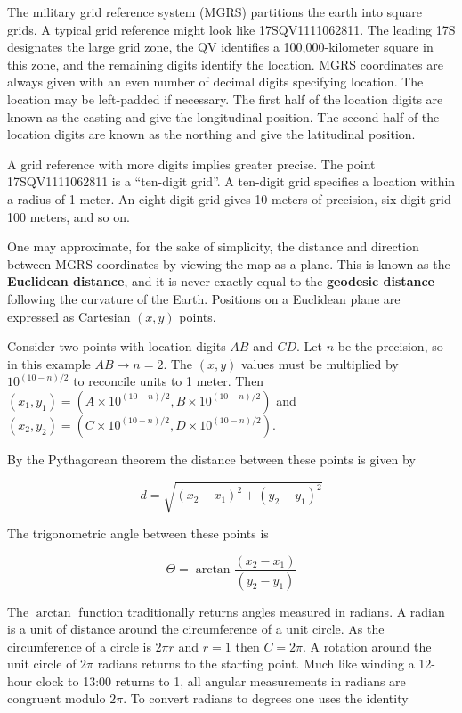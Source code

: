 \documentclass{book}
\begin{document}
The military grid reference system (MGRS) partitions the earth into square grids. A typical grid reference might look like 17SQV1111062811. The leading 17S designates the large grid zone, the QV identifies a 100,000-kilometer square in this zone, and the remaining digits identify the location. MGRS coordinates are always given with an even number of decimal digits specifying location. The location may be left-padded if necessary. The first half of the location digits are known as the easting and give the longitudinal position. The second half of the location digits are known as the northing and give the latitudinal position.

A grid reference with more digits implies greater precise. The point 17SQV1111062811 is a ``ten-digit grid''. A ten-digit grid specifies a location within a radius of 1 meter. An eight-digit grid gives 10 meters of precision, six-digit grid 100 meters, and so on.

One may approximate, for the sake of simplicity, the distance and direction between MGRS coordinates by viewing the map as a plane. This is known as the \textbf{Euclidean distance}, and it is never exactly equal to the \textbf{geodesic distance} following the curvature of the Earth. Positions on a Euclidean plane are expressed as Cartesian $(x,y)$ points.

Consider two points with location digits $AB$ and $CD$. Let $n$ be the precision, so in this example $AB \to n=2$. The $(x,y)$ values must be multiplied by $10^{{(10-n)}/2}$ to reconcile units to 1 meter. Then $(x_1,y_1) = (A \times 10^{{(10 - n)}/2}, B \times 10^{{(10 - n)}/2})$ and $(x_2,y_2) = (C \times 10^{{(10 - n)}/2}, D \times 10^{{(10 - n)}/2})$.

By the Pythagorean theorem the distance between these points is given by 

\begin{equation}
d = \sqrt{(x_2 - x_1)^2 + (y_2 - y_1)^2}
\end{equation}

The trigonometric angle between these points is

\begin{equation}
\Theta = \arctan{\frac{(x_2 - x_1)}{(y_2 - y_1)}}
\end{equation}

The $\arctan$ function traditionally returns angles measured in radians. A radian is a unit of distance around the circumference of a unit circle. As the circumference of a circle is $2 \pi r$ and $r=1$ then $C=2\pi$. A rotation around the unit circle of $2\pi$ radians returns to the starting point. Much like winding a 12-hour clock to 13:00 returns to 1, all angular measurements in radians are congruent modulo $2\pi$. To convert radians to degrees one uses the identity
\end{document}
